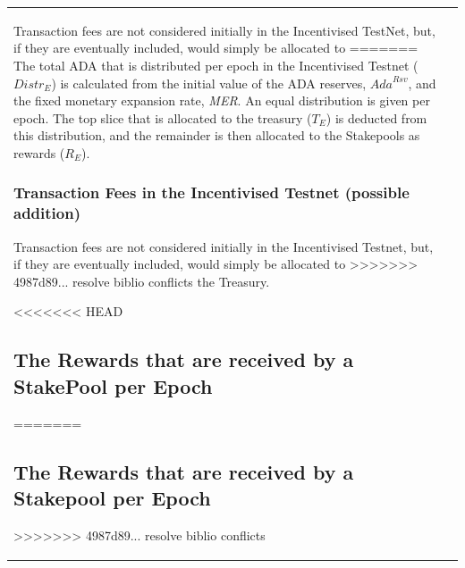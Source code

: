 \documentclass[11pt,a4paper,dvipsnames,twosided,final]{article}
\newcommand{\ada}{ADA{}}
\begin{document}
\begin{tabular}{||l|l||}
Transaction fees are not considered initially in the Incentivised TestNet, but, if they are eventually included, would simply be allocated to
=======
The total \ada{} that is distributed per epoch in the Incentivised Testnet (${\textit{Distr}}_E$) is calculated from the initial
value of the \ada{} reserves, $\textit{Ada}^{\textit{Rsv}}$, and the fixed monetary expansion rate, \textit{MER}.
An equal distribution is given per epoch.  The top slice that is allocated to the treasury ($T_E$) is
deducted from this distribution, and the remainder is then allocated to the Stakepools as rewards ($R_E$).

\subsubsection*{Transaction Fees in the Incentivised Testnet (possible addition)}

Transaction fees are not considered initially in the Incentivised Testnet, but, if they are eventually included, would simply be allocated to
>>>>>>> 4987d89... resolve biblio conflicts
the Treasury.


<<<<<<< HEAD
\subsection{The Rewards that are received by a StakePool per Epoch}
=======
\subsection{The Rewards that are received by a Stakepool per Epoch}
>>>>>>> 4987d89... resolve biblio conflicts


\end{tabular}
\end{document}
